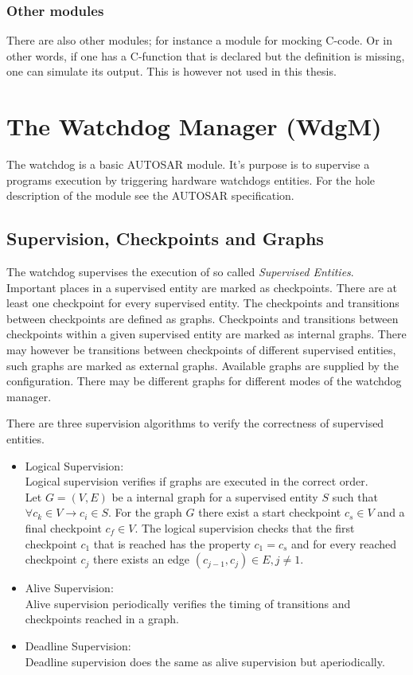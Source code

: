\subsection{Other modules}
\label{APP:SEC:OTHERMODULES}
There are also other modules; for instance a module for mocking C-code. Or in
other words, if one has a C-function that is declared but the
definition is missing, one can simulate its output. This is
however not used in this thesis.


\lstset{style=autosar}
\chapter{The Watchdog Manager (WdgM)}
\label{APPENDIX:WDGM}
The watchdog is a basic AUTOSAR module. It's purpose is to supervise a programs
execution by triggering hardware watchdogs entities. For the hole description of
the module see the AUTOSAR specification.

\section{Supervision, Checkpoints and Graphs}
The watchdog supervises the execution of so called \emph{Supervised Entities}.
Important places in a supervised entity are marked as checkpoints. There are at
least one checkpoint for every supervised entity. The checkpoints and
transitions between checkpoints are defined as graphs. Checkpoints and
transitions between checkpoints within a given supervised entity are marked as
internal graphs. There may however be transitions between checkpoints of
different supervised entities, such graphs are marked as external graphs.
Available graphs are supplied by the configuration. There may be different
graphs for different modes of the watchdog manager.

There are three supervision algorithms to verify the correctness of supervised
entities.
\begin{itemize}
\item Logical Supervision: \\
Logical supervision verifies if graphs are executed in the correct order. \\ Let
$G = (V,E)$ be a internal graph for a supervised entity $S$ such that $\forall c_k
\in V \rightarrow c_i \in S$. For the graph $G$ there exist a start checkpoint
$c_s \in V$ and a final checkpoint $c_f \in V$. The logical supervision
checks that the first checkpoint $c_1$ that is reached has the property $c_1 =
c_s$ and for every reached checkpoint $c_j$ there exists an edge
$(c_{j-1},c_{j}) \in E, j \neq 1$.
\item Alive Supervision: \\
  Alive supervision periodically verifies the timing of transitions and
checkpoints reached in a graph.
\item Deadline Supervision: \\
  Deadline supervision does the same as alive supervision but aperiodically.
\end{itemize}

